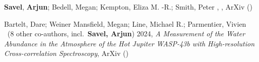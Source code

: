 \item[{\color{numcolor}\scriptsize2}] \textbf{Savel}, \textbf{Arjun}; Bedell, Megan; Kempton, Eliza M. -R.; Smith, Peter , , ArXiv ()

\item[{\color{numcolor}\scriptsize1}] Bartelt, Dare; Weiner Mansfield, Megan; Line, Michael R.; Parmentier, Vivien \etal\ ({8} other co-authors, incl.\ \textbf{Savel, Arjun}) 2024, \emph{A Measurement of the Water Abundance in the Atmosphere of the Hot Jupiter WASP-43b with High-resolution Cross-correlation Spectroscopy}, ArXiv ()